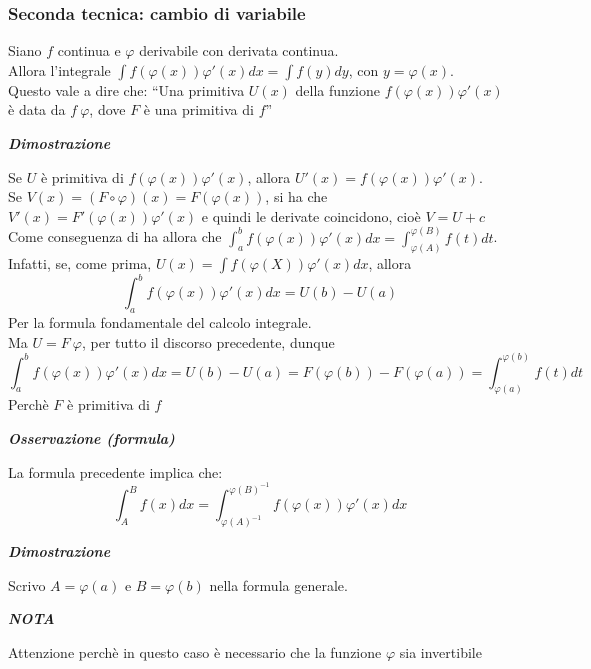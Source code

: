 \documentclass{article}
\theoremstyle{definition}
\newcommand{\virgolette}[1]{``#1''}
\begin{document}
\subsubsection{Seconda tecnica: cambio di variabile}
Siano $f$ continua e $\varphi$ derivabile con derivata continua.
\\
Allora l'integrale $\int f(\varphi (x))\varphi ' (x) dx = \int f(y) dy$, con $y=\varphi (x)$.
\\
Questo vale a dire che: \virgolette{Una primitiva $U(x)$ della funzione $f(\varphi(x))\varphi'(x)$ è data da $f \ \varphi$, dove $F$ è una primitiva di $f$}
\begin{center}
    \textbf{\textit{Dimostrazione}}
\end{center}
Se $U$ è primitiva di $f(\varphi(x)) \varphi ' (x)$, allora $U'(x)=f(\varphi(x)) \varphi ' (x)$.
\\
Se $V(x)=(F \circ \varphi)(x)=F(\varphi(x))$, si ha che $V'(x)=F'(\varphi(x)) \varphi'(x)$ e quindi le derivate coincidono, cioè $V=U+c$
\\
Come conseguenza di ha allora che $\int_a^b f(\varphi(x))\varphi ' (x) dx = \int_{\varphi(A)}^{\varphi (B)} f(t) dt$.
\\
Infatti, se, come prima, $U(x)=\int f(\varphi(X))\varphi'(x) dx$, allora
\begin{equation*}
    \int_a^b f(\varphi(x))\varphi'(x) dx= U(b)-U(a)
\end{equation*}
Per la formula fondamentale del calcolo integrale.
\\
Ma $U=F \ \varphi$, per tutto il discorso precedente, dunque
\begin{equation*}
    \int_a^b f(\varphi(x))\varphi'(x) dx = U(b)-U(a)= F(\varphi(b))-F(\varphi(a))=\int_{\varphi(a)}^{\varphi(b)} f(t) dt
\end{equation*}
Perchè $F$ è primitiva di $f$
\begin{center}
    \textbf{\textit{Osservazione (formula)}}
\end{center}
La formula precedente implica che:
\begin{equation*}
    \int_A^B f(x) dx = \int_{\varphi(A)^{-1}}^{\varphi(B)^{-1}} f(\varphi(x))\varphi'(x) dx
\end{equation*}
\begin{center}
    \textbf{\textit{Dimostrazione}}
\end{center}
Scrivo $A=\varphi(a)$ e $B=\varphi(b)$ nella formula generale.
\begin{center}
    \textbf{\textit{NOTA}}
\end{center}
Attenzione perchè in questo caso è necessario che la funzione $\varphi$ sia invertibile 
\end{document}
